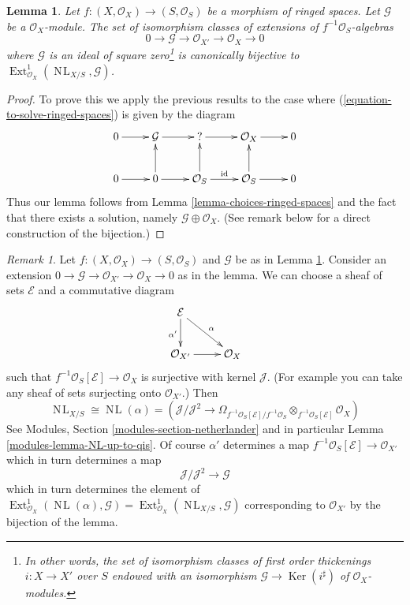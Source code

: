 \documentclass{stacks-project}
\theoremstyle{plain}
\newtheorem{lemma}[subsection]{Lemma}
\theoremstyle{definition}
\theoremstyle{remark}
\newtheorem{remark}[subsection]{Remark}
\numberwithin{equation}{subsection}
\def\Ext{\mathop{\mathrm{Ext}}\nolimits}
\def\NL{\mathop{N\!L}\nolimits}
\def\Ker{\mathop{\mathrm{Ker}}}
\begin{document}
\begin{lemma}
\label{lemma-extensions-of-relative-ringed-spaces}
Let $f : (X, \mathcal{O}_X) \to (S, \mathcal{O}_S)$ be a morphism of
ringed spaces. Let $\mathcal{G}$ be a $\mathcal{O}_X$-module.
The set of isomorphism classes of extensions of
$f^{-1}\mathcal{O}_S$-algebras
$$
0 \to \mathcal{G} \to \mathcal{O}_{X'} \to \mathcal{O}_X \to 0
$$
where $\mathcal{G}$ is an ideal of square zero\footnote{In other words,
the set of isomorphism classes of first order thickenings
$i : X \to X'$ over $S$ endowed with an isomorphism
$\mathcal{G} \to \Ker(i^\sharp)$ of $\mathcal{O}_X$-modules.} 
is canonically bijective to
$\Ext^1_{\mathcal{O}_X}(\NL_{X/S}, \mathcal{G})$.
\end{lemma}

\begin{proof}
To prove this we apply the previous results to the case where
(\ref{equation-to-solve-ringed-spaces}) is given by the diagram
$$
\xymatrix{
0 \ar[r] &
\mathcal{G} \ar[r] &
{?} \ar[r] &
\mathcal{O}_X \ar[r] & 0 \\
0 \ar[r] &
0 \ar[u] \ar[r] &
\mathcal{O}_S \ar[u] \ar[r]^{\text{id}} &
\mathcal{O}_S \ar[u] \ar[r] & 0
}
$$
Thus our lemma follows from Lemma \ref{lemma-choices-ringed-spaces}
and the fact that there exists a solution, namely
$\mathcal{G} \oplus \mathcal{O}_X$.
(See remark below for a direct construction of the bijection.)
\end{proof}

\begin{remark}
\label{remark-extensions-of-relative-ringed-spaces}
Let $f : (X, \mathcal{O}_X) \to (S, \mathcal{O}_S)$ and $\mathcal{G}$
be as in Lemma \ref{lemma-extensions-of-relative-ringed-spaces}.
Consider an extension
$0 \to \mathcal{G} \to \mathcal{O}_{X'} \to \mathcal{O}_X \to 0$
as in the lemma. We can choose a sheaf of sets $\mathcal{E}$
and a commutative diagram
$$
\xymatrix{
\mathcal{E} \ar[d]_{\alpha'} \ar[rd]^\alpha \\
\mathcal{O}_{X'} \ar[r] & \mathcal{O}_X
}
$$
such that $f^{-1}\mathcal{O}_S[\mathcal{E}] \to \mathcal{O}_X$
is surjective with kernel $\mathcal{J}$.
(For example you can take any sheaf of sets surjecting
onto $\mathcal{O}_{X'}$.) Then
$$
\NL_{X/S} \cong \NL(\alpha) = 
\left(
\mathcal{J}/\mathcal{J}^2
\longrightarrow
\Omega_{f^{-1}\mathcal{O}_S[\mathcal{E}]/f^{-1}\mathcal{O}_S}
\otimes_{f^{-1}\mathcal{O}_S[\mathcal{E}]} \mathcal{O}_X\right)
$$
See Modules, Section \ref{modules-section-netherlander} and in particular
Lemma \ref{modules-lemma-NL-up-to-qis}. Of course $\alpha'$ determines a map
$f^{-1}\mathcal{O}_S[\mathcal{E}] \to \mathcal{O}_{X'}$
which in turn determines a map
$$
\mathcal{J}/\mathcal{J}^2 \longrightarrow \mathcal{G}
$$
which in turn determines the element of
$\Ext^1_{\mathcal{O}_X}(\NL(\alpha), \mathcal{G}) =
\Ext^1_{\mathcal{O}_X}(\NL_{X/S}, \mathcal{G})$
corresponding to $\mathcal{O}_{X'}$ by the bijection of the lemma.
\end{remark}
\end{document}
